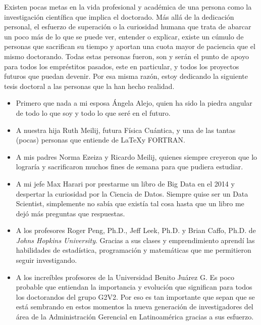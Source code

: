 \clearpage
\begin{center}
    \thispagestyle{empty}
    \vspace*{\fill}
        Existen pocas metas en la vida profesional y académica de una persona como la investigación científica que implica el doctorado. Más allá de la dedicación personal, el esfuerzo de superación o la curiosidad humana que trata de abarcar un poco más de lo que se puede ver, entender o explicar, existe un cúmulo de personas que sacrifican su tiempo y aportan una cuota mayor de paciencia que el mismo doctorando. Todas estas personas fueron, son y serán el punto de apoyo para todos los empréstitos pasados, este en particular, y todos los proyectos futuros que puedan devenir. Por esa misma razón, estoy dedicando la siguiente tesis doctoral a las personas que la han hecho realidad.
            
        \begin{itemize}
            \item Primero que nada a mi esposa Ángela Alejo, quien ha sido la piedra angular de todo lo que soy y todo lo que seré en el futuro. 
            \item A nuestra hija Ruth Meilij, futura Física Cuántica, y una de las tantas (pocas) personas que entiende de \LaTeX y FORTRAN.
            \item A mis padres Norma Ezeiza y Ricardo Meilij, quienes siempre creyeron que lo lograría y sacrificaron muchos fines de semana para que pudiera estudiar.
            \item A mi jefe Max Harari por prestarme un libro de Big Data en el 2014 y despertar la curiosidad por la Ciencia de Datos. Siempre quise ser un Data Scientist, simplemente no sabía que existía tal cosa hasta que un libro me dejó más preguntas que respuestas. 
            \item A los profesores Roger Peng, Ph.D., Jeff Leek, Ph.D. y Brian Caffo, Ph.D. de \emph{Johns Hopkins University}. Gracias a sus clases y emprendimiento aprendí las habilidades de estadística, programación y matemáticas que me permitieron seguir investigando. 
            \item A los increíbles profesores de la Universidad Benito Juárez G. Es poco probable que entiendan la importancia y evolución que significan para todos los doctorandos del grupo G2V2. Por eso es tan importante que sepan que se está sembrando en estos momentos la nueva generación de investigadores del área de la Administración Gerencial en Latinoamérica gracias a sus esfuerzo. 
        \end{itemize}
    \vspace*{\fill}
    \end{center}
\clearpage
